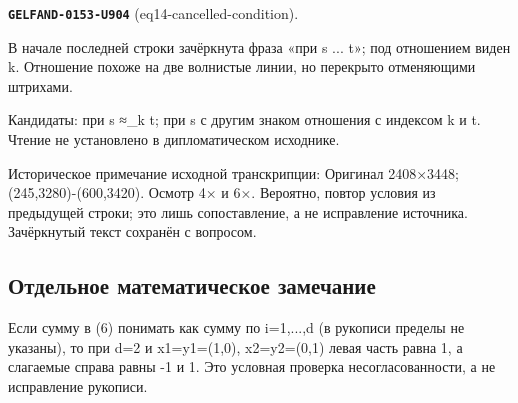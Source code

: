 \par\noindent\leavevmode{}\label{GELFAND-0153-U904}\textbf{\texttt{GELFAND-0153-U904}} (eq14-cancelled-condition).\nopagebreak[4]\par
В начале последней строки зачёркнута фраза «при s ... t»; под отношением виден k. Отношение похоже на две волнистые линии, но перекрыто отменяющими штрихами.\par
Кандидаты: при s ≈\_k t; при s с другим знаком отношения с индексом k и t. Чтение не установлено в дипломатическом исходнике.\par
Историческое примечание исходной транскрипции: Оригинал 2408×3448; (245,3280)-(600,3420). Осмотр 4× и 6×. Вероятно, повтор условия из предыдущей строки; это лишь сопоставление, а не исправление источника. Зачёркнутый текст сохранён с вопросом.\par\medskip
\subsection*{Отдельное математическое замечание}\label{GELFAND-P001412-EDITORIAL-MATH-01}
Если сумму в (6) понимать как сумму по i=1,...,d (в рукописи пределы не указаны), то при d=2 и x1=y1=(1,0), x2=y2=(0,1) левая часть равна 1, а слагаемые справа равны -1 и 1. Это условная проверка несогласованности, а не исправление рукописи.\par
